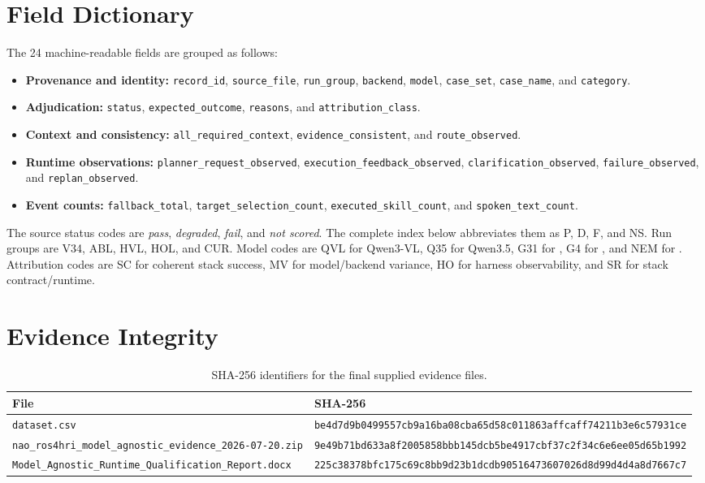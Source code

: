 \section{Field Dictionary}

The 24 machine-readable fields are grouped as follows:

\begin{itemize}
  \item \textbf{Provenance and identity:} \nolinkurl{record_id}, \nolinkurl{source_file}, \nolinkurl{run_group}, \nolinkurl{backend}, \nolinkurl{model}, \nolinkurl{case_set}, \nolinkurl{case_name}, and \nolinkurl{category}.
  \item \textbf{Adjudication:} \nolinkurl{status}, \nolinkurl{expected_outcome}, \nolinkurl{reasons}, and \nolinkurl{attribution_class}.
  \item \textbf{Context and consistency:} \nolinkurl{all_required_context}, \nolinkurl{evidence_consistent}, and \nolinkurl{route_observed}.
  \item \textbf{Runtime observations:} \nolinkurl{planner_request_observed}, \nolinkurl{execution_feedback_observed}, \nolinkurl{clarification_observed}, \nolinkurl{failure_observed}, and \nolinkurl{replan_observed}.
  \item \textbf{Event counts:} \nolinkurl{fallback_total}, \nolinkurl{target_selection_count}, \nolinkurl{executed_skill_count}, and \nolinkurl{spoken_text_count}.
\end{itemize}

The source status codes are \emph{pass}, \emph{degraded}, \emph{fail}, and \emph{not scored}. The complete index below abbreviates them as P, D, F, and NS. Run groups are V34, ABL, HVL, HOL, and CUR. Model codes are QVL for Qwen3-VL, Q35 for Qwen3.5, G31 for , G4 for , and NEM for . Attribution codes are SC for coherent stack success, MV for model/backend variance, HO for harness observability, and SR for stack contract/runtime.

\section{Evidence Integrity}

\begin{table}[H]
\centering
\scriptsize
\renewcommand{\arraystretch}{1.12}
\caption{SHA-256 identifiers for the final supplied evidence files.}
\label{tab:evidence-hashes}
\begin{tabularx}{\textwidth}{@{}p{}X@{}}
\toprule
\textbf{File} & \textbf{SHA-256}\\
\midrule
\nolinkurl{dataset.csv} &
\texttt{be4d7d9b0499557cb9a16ba08cba65d58c011863affcaff74211b3e6c57931ce}\\
\nolinkurl{nao_ros4hri_model_agnostic_evidence_2026-07-20.zip} &
\texttt{9e49b71bd633a8f2005858bbb145dcb5be4917cbf37c2f34c6e6ee05d65b1992}\\
\nolinkurl{Model_Agnostic_Runtime_Qualification_Report.docx} &
\texttt{225c38378bfc175c69c8bb9d23b1dcdb90516473607026d8d99d4d4a8d7667c7}\\
\bottomrule
\end{tabularx}
\end{table}

